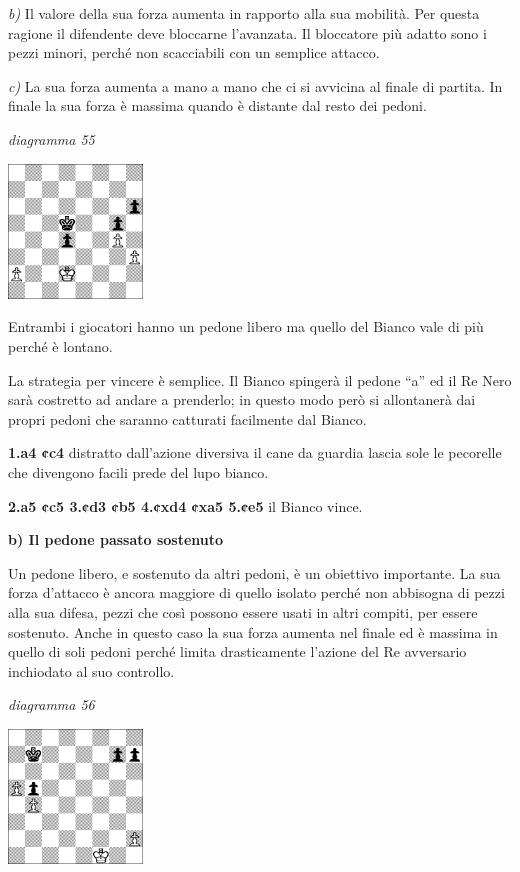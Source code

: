 \documentclass[
]{article}
\begin{document}
\emph{b)} Il valore della sua forza aumenta in rapporto alla sua
mobilità. Per questa ragione il difendente deve bloccarne l'avanzata. Il
bloccatore più adatto sono i pezzi minori, perché non scacciabili con un
semplice attacco.

\emph{c)} La sua forza aumenta a mano a mano che ci si avvicina al
finale di partita. In finale la sua forza è massima quando è distante
dal resto dei pedoni.

\emph{diagramma 55}

\includegraphics[width=1.40972in,height=1.40972in]{vertopal_109f12be458a423d8f3cc838880eaea2/media/image55.png}

Entrambi i giocatori hanno un pedone libero ma quello del Bianco vale di
più perché è lontano.

La strategia per vincere è semplice. Il Bianco spingerà il pedone ``a''
ed il Re Nero sarà costretto ad andare a prenderlo; in questo modo però
si allontanerà dai propri pedoni che saranno catturati facilmente dal
Bianco.

\textbf{1.a4 ¢c4} distratto dall'azione diversiva il cane da guardia
lascia sole le pecorelle che divengono facili prede del lupo bianco.

\textbf{2.a5 ¢c5 3.¢d3 ¢b5 4.¢xd4 ¢xa5 5.¢e5} il Bianco vince.

\textbf{b) Il pedone passato sostenuto}

Un pedone libero, e sostenuto da altri pedoni, è un obiettivo
importante. La sua forza d'attacco è ancora maggiore di quello isolato
perché non abbisogna di pezzi alla sua difesa, pezzi che così possono
essere usati in altri compiti, per essere sostenuto. Anche in questo
caso la sua forza aumenta nel finale ed è massima in quello di soli
pedoni perché limita drasticamente l'azione del Re avversario inchiodato
al suo controllo.

\emph{diagramma 56}

\includegraphics[width=1.40972in,height=1.40972in]{vertopal_109f12be458a423d8f3cc838880eaea2/media/image56.png}
\end{document}
